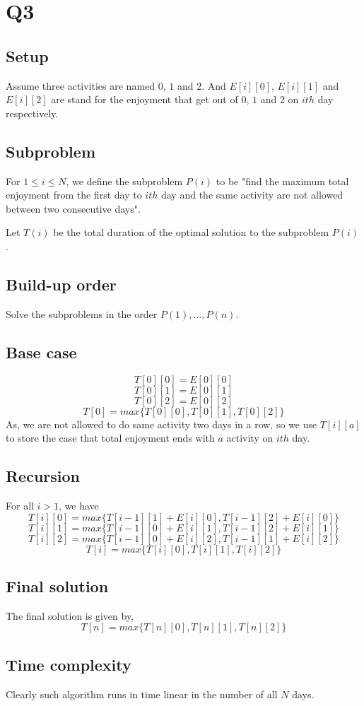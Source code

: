 \documentclass[a4paper]{article}
\begin{document}
		
	\section*{Q3}
	\subsection*{Setup}
	Assume three activities are named $0$, $1$ and $2$. And $E[i][0]$, $E[i][1]$ and $E[i][2]$ are stand for the enjoyment that get out of $0$, $1$ and $2$ on $ith$ day respectively.
	\subsection*{Subproblem}
	For $1 \leq i \leq N$, we define the subproblem $P(i)$ to be "find the maximum total enjoyment from the first day to $ith$ day and the same activity are not allowed between two consecutive days".
	
	Let $T(i)$ be the total duration of the optimal solution to the subproblem $P(i)$.
	\subsection*{Build-up order}
	Solve the subproblems in the order $P(1), \dots, P(n)$.
	\subsection*{Base case}
	\[T[0][0] = E[0][0]\]
	\[T[0][1] = E[0][1]\]
	\[T[0][2] = E[0][2]\]
	\[T[0] = max\{T[0][0], T[0][1], T[0][2]\}\]
	As, we are not allowed to do same activity two days in a row, so we use $T[i][a]$ to store the case that total enjoyment ends with $a$ activity on $ith$ day.
	\subsection*{Recursion}
	For all $i>1$, we have
	\[T[i][0] = max\{T[i-1][1]+E[i][0] ,T[i-1][2]+E[i][0]\}\]
	\[T[i][1] = max\{T[i-1][0]+E[i][1] ,T[i-1][2]+E[i][1]\}\]
	\[T[i][2] = max\{T[i-1][0]+E[i][2] ,T[i-1][1]+E[i][2]\}\]
	\[T[i] = max\{T[i][0], T[i][1], T[i][2]\}\]
	
	\subsection*{Final solution}
	The final solution is given by,
	\[T[n] = max\{T[n][0], T[n][1], T[n][2]\}\]
	\subsection*{Time complexity}
	Clearly such algorithm runs in time linear in the number of all $N$ days.
	
\end{document}
